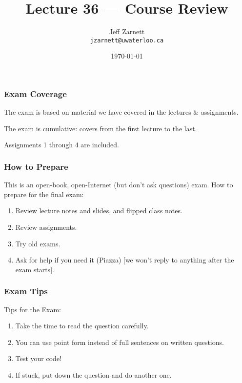 

\title{Lecture 36 --- Course Review }

\author{Jeff Zarnett \\ \small \texttt{jzarnett@uwaterloo.ca}}
\date{\today}




\begin{frame}
  \titlepage

\end{frame}

\begin{frame}
\frametitle{Exam Coverage}

The exam is based on material we have covered in the lectures \& assignments.

The exam is cumulative: covers from the first lecture to the last.

Assignments 1 through 4 are included.

\end{frame}

\begin{frame}
\frametitle{How to Prepare}

This is an open-book, open-Internet (but don't ask questions) exam.
How to prepare for the final exam:

\begin{enumerate}
	\item Review lecture notes and slides, and flipped class notes.
	\item Review assignments.
	\item Try old exams.
	\item Ask for help if you need it (Piazza) [we won't reply to anything after the exam starts].
\end{enumerate}

\end{frame}

\begin{frame}
\frametitle{Exam Tips}

Tips for the Exam:

\begin{enumerate}
	\item Take the time to read the question carefully.
	\item You can use point form instead of full sentences on written questions.
	\item Test your code!
	\item If stuck, put down the question and do another one.
\end{enumerate}

\end{frame}


